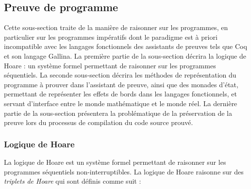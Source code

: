 		\subsection{Preuve de programme}
			
			Cette sous-section traite de la manière de raisonner sur les programmes, en particulier sur les programmes impératifs dont le paradigme est à priori incompatible avec les langages fonctionnels des assistants de preuves tels que Coq et son langage Gallina. La première partie de la sous-section décrira la logique de Hoare : un système formel permettant de raisonner sur les programmes séquentiels. La seconde sous-section décrira les méthodes de représentation du programme à prouver dans l'assistant de preuve, ainsi que des monades d'état, permettant de représenter les effets de bords dans les langages fonctionnels, et servant d'interface entre le monde mathématique et le monde réel. La dernière partie de la sous-section présentera la problématique de la préservation de la preuve lors du processus de compilation du code source prouvé. 

			\subsubsection{Logique de Hoare}

			La logique de Hoare est un système formel permettant de raisonner sur les programmes séquentiels non-interruptibles.
			La logique de Hoare raisonne sur des \emph{triplets de Hoare} qui sont définis comme suit :
			
